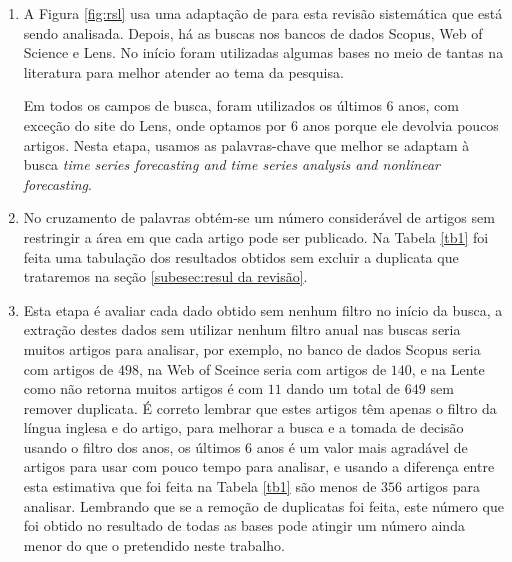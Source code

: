 \begin{enumerate}[start=1, label = {\textbf{Etapa} \arabic* } ]
	
	
	\item \label{etp:rev-1}A Figura \ref{fig:rsl} usa uma adaptação de  para esta revisão sistemática que está sendo analisada. Depois, há as buscas nos bancos de dados Scopus, Web of Science e Lens. No início foram utilizadas algumas bases no meio de tantas na literatura para melhor atender ao tema da pesquisa.
	
	
	
	Em todos os campos de busca, foram utilizados os últimos 6 anos, com exceção do site do Lens, onde optamos por 6 anos porque ele devolvia poucos artigos. Nesta etapa, usamos as palavras-chave que melhor se adaptam à busca \textit{time series forecasting and time series analysis and nonlinear forecasting}.
	
	
	\item \label{etp:rev-2} No cruzamento de palavras obtém-se um número considerável de artigos sem restringir a área em que cada artigo pode ser publicado. Na Tabela \ref{tb1} foi feita uma tabulação dos resultados obtidos sem excluir a duplicata que trataremos na seção \ref{subesec:resul da revisão}.
	
	\item \label{etp:rev-3}Esta etapa é avaliar cada dado obtido sem nenhum filtro no início da busca, a extração destes dados sem utilizar nenhum filtro anual nas buscas seria muitos artigos para analisar, por exemplo, no banco de dados Scopus seria com artigos de $498$, na Web of Sceince seria com artigos de $140$, e na Lente como não retorna muitos artigos é com $11$ dando um total de $649$ sem remover duplicata. É correto lembrar que estes artigos têm apenas o filtro da língua inglesa e do artigo, para melhorar a busca e a tomada de decisão usando o filtro dos anos, os últimos 6 anos é um valor mais agradável de artigos para usar com pouco tempo para analisar, e usando a diferença entre esta estimativa que foi feita na Tabela \ref{tb1} são menos de $356$ artigos para analisar. Lembrando que se a remoção de duplicatas foi feita, este número que foi obtido no resultado de todas as bases pode atingir um número ainda menor do que o pretendido neste trabalho.
	

\end{enumerate}
